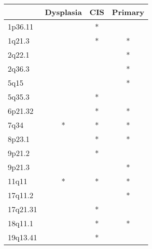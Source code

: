 \begin{tabular}{lccc}
\toprule
{} & Dysplasia & CIS & Primary \\
\midrule
1p36.11  &           &   * &         \\
1q21.3   &           &   * &       * \\
2q22.1   &           &     &       * \\
2q36.3   &           &     &       * \\
5q15     &           &     &       * \\
5q35.3   &           &   * &         \\
6p21.32  &           &   * &       * \\
7q34     &         * &   * &       * \\
8p23.1   &           &   * &       * \\
9p21.2   &           &   * &         \\
9p21.3   &           &     &       * \\
11q11    &         * &   * &       * \\
17q11.2  &           &     &       * \\
17q21.31 &           &   * &         \\
18q11.1  &           &   * &       * \\
19q13.41 &           &   * &         \\
\bottomrule
\end{tabular}
